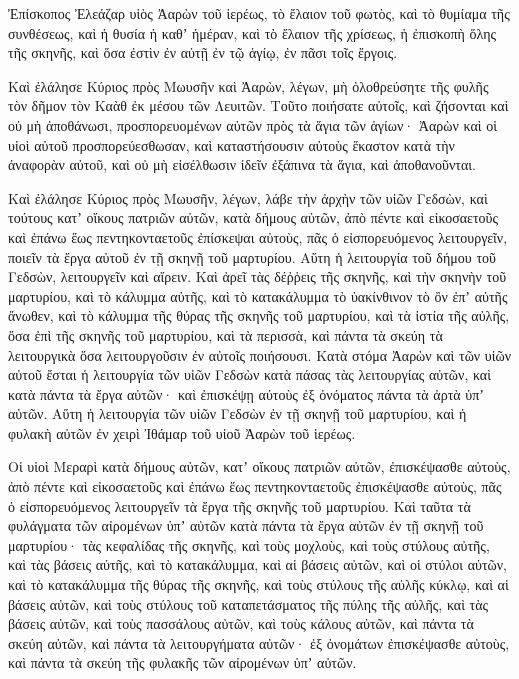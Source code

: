 {\par }{\PP {}Ἐπίσκοπος Ἐλεάζαρ υἱὸς Ἀαρὼν τοῦ ἱερέως, τὸ ἔλαιον τοῦ φωτὸς, καὶ τὸ θυμίαμα τῆς συνθέσεως, καὶ ἡ θυσία ἡ καθʼ ἡμέραν, καὶ τὸ ἔλαιον τῆς χρίσεως, ἡ ἐπισκοπὴ ὅλης τῆς σκηνῆς, καὶ ὅσα ἐστὶν ἐν αὐτῇ ἐν τῷ ἁγίῳ, ἐν πᾶσι τοῖς ἔργοις.
\par }{\PP {}Καὶ ἐλάλησε Κύριος πρὸς Μωυσῆν καὶ Ἀαρὼν, λέγων,
μὴ ὀλοθρεύσητε τῆς φυλῆς τὸν δῆμον τὸν Καὰθ ἐκ μέσου τῶν Λευιτῶν.
Τοῦτο ποιήσατε αὐτοῖς, καὶ ζήσονται καὶ οὐ μὴ ἀποθάνωσι, προσπορευομένων αὐτῶν πρὸς τὰ ἅγια τῶν ἁγίων· Ἀαρὼν καὶ οἱ υἱοὶ αὐτοῦ προσπορεύεσθωσαν, καὶ καταστήσουσιν αὐτοὺς ἕκαστον κατὰ τὴν ἀναφορὰν αὐτοῦ,
καὶ οὐ μὴ εἰσέλθωσιν ἰδεῖν ἐξάπινα τὰ ἅγια, καὶ ἀποθανοῦνται.
\par }{\PP {}Καὶ ἐλάλησε Κύριος πρὸς Μωυσῆν, λέγων,
λάβε τὴν ἀρχὴν τῶν υἱῶν Γεδσὼν, καὶ τούτους κατʼ οἴκους πατριῶν αὐτῶν, κατὰ δήμους αὐτῶν,
ἀπὸ πέντε καὶ εἰκοσαετοῦς καὶ ἐπάνω ἕως πεντηκονταετοῦς ἐπίσκεψαι αὐτοὺς, πᾶς ὁ εἰσπορευόμενος λειτουργεῖν, ποιεῖν τὰ ἔργα αὐτοῦ ἐν τῇ σκηνῇ τοῦ μαρτυρίου.
Αὕτη ἡ λειτουργία τοῦ δήμου τοῦ Γεδσὼν, λειτουργεῖν καὶ αἴρειν.
Καὶ ἀρεῖ τὰς δέῤῥεις τῆς σκηνῆς, καὶ τὴν σκηνὴν τοῦ μαρτυρίου, καὶ τὸ κάλυμμα αὐτῆς, καὶ τὸ κατακάλυμμα τὸ ὑακίνθινον τὸ ὂν ἐπʼ αὐτῆς ἄνωθεν, καὶ τὸ κάλυμμα τῆς θύρας τῆς σκηνῆς τοῦ μαρτυρίου,
καὶ τὰ ἱστία τῆς αὐλῆς, ὅσα ἐπὶ τῆς σκηνῆς τοῦ μαρτυρίου, καὶ τὰ περισσὰ, καὶ πάντα τὰ σκεύη τὰ λειτουργικὰ ὅσα λειτουργοῦσιν ἐν αὐτοῖς ποιήσουσι.
Κατὰ στόμα Ἀαρὼν καὶ τῶν υἱῶν αὐτοῦ ἔσται ἡ λειτουργία τῶν υἱῶν Γεδσὼν κατὰ πάσας τὰς λειτουργίας αὐτῶν, καὶ κατὰ πάντα τὰ ἔργα αὐτῶν· καὶ ἐπισκέψῃ αὐτοὺς ἐξ ὀνόματος πάντα τὰ ἀρτὰ ὑπʼ αὐτῶν.
Αὕτη ἡ λειτουργία τῶν υἱῶν Γεδσὼν ἐν τῇ σκηνῇ τοῦ μαρτυρίου, καὶ ἡ φυλακὴ αὐτῶν ἐν χειρὶ Ἰθάμαρ τοῦ υἱοῦ Ἀαρὼν τοῦ ἱερέως.
\par }{\PP {}Οἱ υἱοὶ Μεραρὶ κατὰ δήμους αὐτῶν, κατʼ οἴκους πατριῶν αὐτῶν, ἐπισκέψασθε αὐτοὺς,
ἀπὸ πέντε καὶ εἰκοσαετοῦς καὶ ἐπάνω ἕως πεντηκονταετοῦς ἐπισκέψασθε αὐτοὺς, πᾶς ὁ εἰσπορευόμενος λειτουργεῖν τὰ ἔργα τῆς σκηνῆς τοῦ μαρτυρίου.
Καὶ ταῦτα τὰ φυλάγματα τῶν αἰρομένων ὑπʼ αὐτῶν κατὰ πάντα τὰ ἔργα αὐτῶν ἐν τῇ σκηνῇ τοῦ μαρτυρίου· τὰς κεφαλίδας τῆς σκηνῆς, καὶ τοὺς μοχλοὺς, καὶ τοὺς στύλους αὐτῆς, καὶ τὰς βάσεις αὐτῆς, καὶ τὸ κατακάλυμμα, καὶ αἱ βάσεις αὐτῶν, καὶ οἱ στύλοι αὐτῶν, καὶ τὸ κατακάλυμμα τῆς θύρας τῆς σκηνῆς,
καὶ τοὺς στύλους τῆς αὐλῆς κύκλῳ, καὶ αἱ βάσεις αὐτῶν, καὶ τοὺς στύλους τοῦ καταπετάσματος τῆς πύλης τῆς αὐλῆς, καὶ τὰς βάσεις αὐτῶν, καὶ τοὺς πασσάλους αὐτῶν, καὶ τοὺς κάλους αὐτῶν, καὶ πάντα τὰ σκεύη αὐτῶν, καὶ πάντα τὰ λειτουργήματα αὐτῶν· ἐξ ὀνομάτων ἐπισκέψασθε αὐτοὺς, καὶ πάντα τὰ σκεύη τῆς φυλακῆς τῶν αἰρομένων ὑπʼ αὐτῶν.
}
